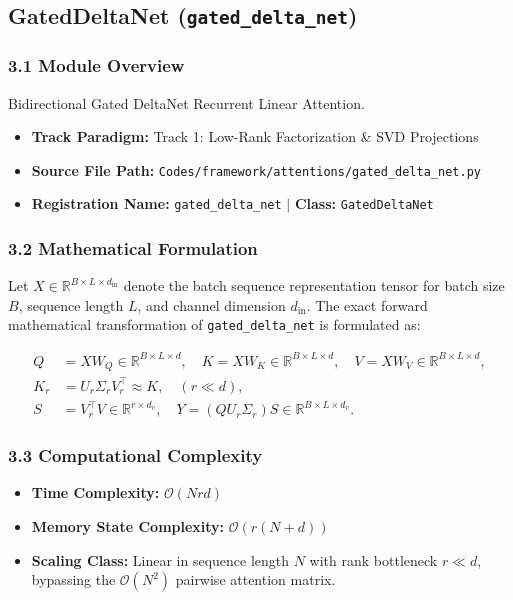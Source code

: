 \subsection{GatedDeltaNet (\texttt{gated\_delta\_net})}
\label{sec:app_module_gated_delta_net}

\subsubsection*{3.1 Module Overview}
Bidirectional Gated DeltaNet Recurrent Linear Attention.
\begin{itemize}
    \item \textbf{Track Paradigm:} Track 1: Low-Rank Factorization \& SVD Projections
    \item \textbf{Source File Path:} \texttt{Codes/framework/attentions/gated\_delta\_net.py}
    \item \textbf{Registration Name:} \texttt{gated\_delta\_net} $\mid$ \textbf{Class:} \texttt{GatedDeltaNet}
\end{itemize}

\subsubsection*{3.2 Mathematical Formulation}
Let $X \in \mathbb{R}^{B \times L \times d_{\text{in}}}$ denote the batch sequence representation tensor for batch size $B$, sequence length $L$, and channel dimension $d_{\text{in}}$. The exact forward mathematical transformation of \texttt{gated\_delta\_net} is formulated as:

\begin{align}
Q &= X W_Q \in \mathbb{R}^{B \times L \times d}, \quad K = X W_K \in \mathbb{R}^{B \times L \times d}, \quad V = X W_V \in \mathbb{R}^{B \times L \times d}, \\
K_r &= U_r \Sigma_r V_r^\top \approx K, \quad (r \ll d), \\
S &= V_r^\top V \in \mathbb{R}^{r \times d_v}, \quad Y = (Q U_r \Sigma_r) S \in \mathbb{R}^{B \times L \times d_v}.
\end{align}


\subsubsection*{3.3 Computational Complexity}
\begin{itemize}
    \item \textbf{Time Complexity:} $\mathcal{O}(N r d)$
    \item \textbf{Memory State Complexity:} $\mathcal{O}(r(N + d))$
    \item \textbf{Scaling Class:} Linear in sequence length $N$ with rank bottleneck $r \ll d$, bypassing the $\mathcal{O}(N^2)$ pairwise attention matrix.
\end{itemize}

